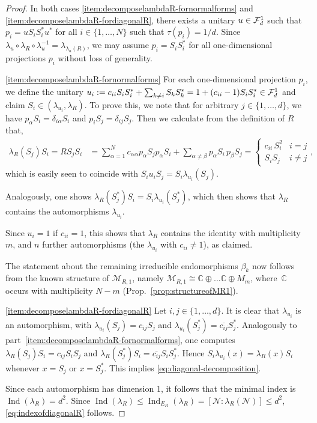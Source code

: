 \documentclass[12pt,a4paper]{amsart}
\numberwithin{equation}{section}
\theoremstyle{remark}
\def\Ind{\operatorname{Ind}}
\newcommand{\Cl}{\mathbb{C}}
\newcommand{\la}{\lambda}
\newcommand{\CM}[0]{\mathcal{M}} \newcommand{\CN}[0]{\mathcal{N}}
\begin{document}
\begin{proof}
    In both cases \ref{item:decomposelambdaR-fornormalforms} and \ref{item:decomposelambdaR-fordiagonalR}, there exists a unitary $u\in\mathcal{F}_d^1$ such that $p_i=uS_iS_i^*u^*$ for all $i\in\{1,\ldots,N\}$ such that $\tau(p_i)=1/d$. Since $\la_u\circ\la_R\circ\la_u^{-1}=\la_{\la_u(R)}$, we may assume $p_i=S_iS_i^*$ for all one-dimensional projections $p_i$ without loss of generality.
    
    
    \ref{item:decomposelambdaR-fornormalforms}  For each one-dimensional projection $p_i$, we define the unitary $u_i:=c_{ii}S_iS_i^*+\sum_{k\neq i}S_kS_k^*=1+(c_{ii}-1)S_iS_i^*\in\mathcal{F}_d^1$ and claim $S_i\in(\la_{u_i},\la_R)$. To prove this, we note that for arbitrary $j\in\{1,\ldots,d\}$, we have $p_\alpha S_i=\delta_{i\alpha}S_i$ and $p_iS_j=\delta_{ij}S_j$. Then we calculate from the definition of $R$ that, 
    \begin{align*}
        \la_R(S_j)S_i
        =
        RS_jS_i
        &=
        \sum_{\alpha=1}^Nc_{\alpha\alpha}p_\alpha S_j p_\alpha S_i+\sum_{\alpha\neq\beta} p_\alpha S_i\, p_\beta S_j
        =
         \begin{cases}
            c_{ii}\,S_i^2 & i=j\\
            S_iS_j & i\neq j
        \end{cases},
    \end{align*}
    which is easily seen to coincide with $S_iu_iS_j=S_i\la_{u_i}(S_j)$.
    
    Analogously, one shows $\la_R(S_j^*)S_i=S_i\la_{u_i}(S_j^*)$, which then shows that $\la_R$ contains the automorphisms $\la_{u_i}$. 
    
    Since $u_i=1$ if $c_{ii}=1$, this shows that $\la_R$ contains the identity with multiplicity $m$, and $n$ further automorphisms (the $\la_{u_i}$ with $c_{ii}\neq1$), as claimed.
    
    The statement about the remaining irreducible endomorphisms $\beta_k$ now follows from the known structure of $\CM_{R,1}$, namely $\CM_{R,1}\cong\Cl\oplus\ldots\Cl\oplus M_m$, where~$\Cl$ occurs with multiplicity $N-m$ (Prop.~\ref{prop:structureofMR1}).
    
    \ref{item:decomposelambdaR-fordiagonalR} Let $i,j\in\{1,\ldots,d\}$. It is clear that $\lambda_{u_i}$ is an automorphism, with $\lambda_{u_i}(S_j)=c_{ij}S_j$ and $\lambda_{u_i}(S_j^*)=\overline{c_{ij}}S_j^*$. Analogously to part~\ref{item:decomposelambdaR-fornormalforms}, one computes $\lambda_R(S_j)S_i=c_{ij}S_iS_j$ and $\lambda_R(S_j^*)S_i=\overline{c_{ij}}S_iS_j^*$. Hence $S_i\lambda_{u_i}(x)=\lambda_R(x)S_i$ whenever $x=S_j$ or $x=S_j^*$. This implies \eqref{eq:diagonal-decomposition}.
    
    Since each automorphism has dimension $1$, it follows that the minimal index is $\Ind(\la_R)=d^2$. Since $\Ind(\la_R)\leq\Ind_{E_R}(\la_R)=[\CN:\la_R(\CN)]\leq d^2$, \eqref{eq:indexofdiagonalR} follows.
\end{proof}
\end{document}
